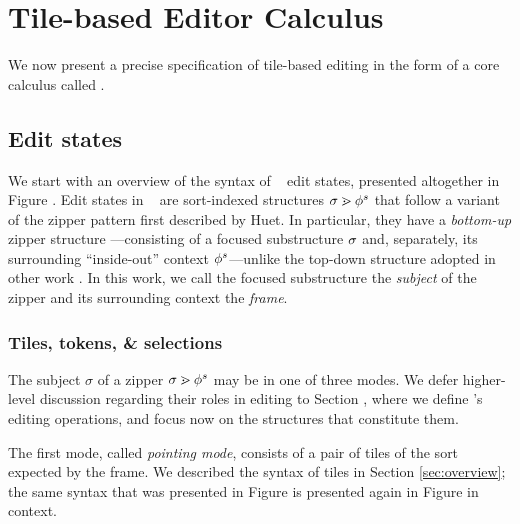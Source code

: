 
\section{Tile-based Editor Calculus}\label{sec:formalism}

We now present a precise specification of tile-based
editing in the form of a core calculus called \ty.


\subsection{Edit states}


We start with an overview of the syntax of \ty~ edit states,
presented altogether in Figure .
Edit states in \ty~ are sort-indexed structures
$\sigma \gtrdot \phi^s$ that follow a variant
of the zipper pattern first described by Huet.
In particular, they have a \emph{bottom-up}
zipper structure ---consisting of a focused substructure
$\sigma$ and, separately,
its surrounding ``inside-out'' context $\phi^s$---unlike
the top-down structure adopted in other work .
In this work, we call the focused substructure the \emph{subject} of
the zipper and its surrounding context the \emph{frame}.

\subsubsection{Tiles, tokens, \& selections}
The subject $\sigma$ of a zipper $\sigma \gtrdot \phi^s$
may be in one of three modes.
We defer higher-level discussion regarding their roles in
editing to Section , where we define \ty's editing
operations, and focus now on the structures that constitute them.

The first mode, called \emph{pointing mode}, consists of
a pair of tiles of the sort expected by the frame.
We described the syntax of tiles
in Section \ref{sec:overview};
the same syntax that was presented in Figure 
is presented again in Figure  in context.

